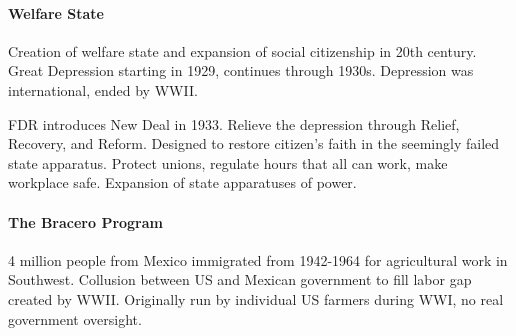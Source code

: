 \paragraph{Welfare State} Creation of welfare state and expansion of social citizenship in 20th century. Great Depression starting in 1929, continues through 1930s. Depression was international, ended by WWII.

FDR introduces New Deal in 1933. Relieve the depression through Relief, Recovery, and Reform. Designed to restore citizen's faith in the seemingly failed state apparatus. Protect unions, regulate hours that all can work, make workplace safe. Expansion of state apparatuses of power.

\paragraph{The Bracero Program} 4 million people from Mexico immigrated from 1942-1964 for agricultural work in Southwest. Collusion between US and Mexican government to fill labor gap created by WWII. Originally run by individual US farmers during WWI, no real government oversight.